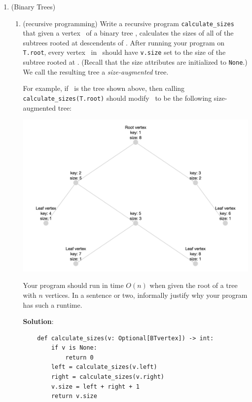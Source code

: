 \documentclass[11pt]{article}
\begin{document}

 \newcommand{\children}{\mathit{children}}
 \newcommand{\parent}{\mathit{parent}}
 
\begin{enumerate}
\item (Binary Trees) 

 \begin{enumerate}
 \item \label{part:calculatesizes} (recursive programming)
 Write a recursive program \texttt{calculate\_sizes} that given a vertex \btv\ of a binary tree \treeT, calculates the sizes of all of the subtrees rooted at descendents of \btv.  After running your program on \texttt{T.root}, every vertex \btv\ in \treeT\ should have \texttt{v.size} set to the size of the subtree rooted at \btv. (Recall that the size attributes are initialized to \texttt{None}.)  We call the resulting tree a {\em size-augmented} tree.
 
For example, if \treeT\  is the  tree shown above, 
then calling \texttt{calculate\_sizes(T.root)} should modify  \treeT\ to be the following size-augmented tree:

 \includegraphics[scale=.175]{Fall23/p0_q1_BT_after.png}

 Your program should run in time $O(n)$ when given the root of a tree with $n$ vertices. In a sentence or two, informally justify why your program has such a runtime. 

\textbf{Solution}:
\begin{verbatim}
    def calculate_sizes(v: Optional[BTvertex]) -> int:
        if v is None:
            return 0
        left = calculate_sizes(v.left)
        right = calculate_sizes(v.right)
        v.size = left + right + 1
        return v.size
\end{verbatim}


\end{enumerate}
\end{enumerate}
\end{document}
